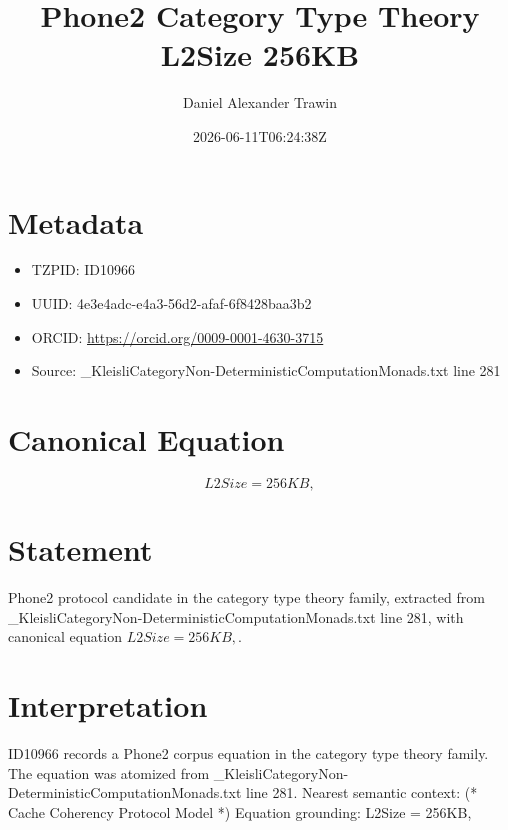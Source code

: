 \documentclass[11pt]{article}
\title{Phone2 Category Type Theory L2Size 256KB}
\author{Daniel Alexander Trawin}
\date{2026-06-11T06:24:38Z}
\begin{document}
\maketitle
\section*{Metadata}
\begin{itemize}
\item TZPID: ID10966
\item UUID: 4e3e4adc-e4a3-56d2-afaf-6f8428baa3b2
\item ORCID: \url{https://orcid.org/0009-0001-4630-3715}
\item Source: _KleisliCategoryNon-DeterministicComputationMonads.txt line 281
\end{itemize}
\section*{Canonical Equation}
\[
L2Size = 256KB,
\]
\section*{Statement}
Phone2 protocol candidate in the category type theory family, extracted from _KleisliCategoryNon-DeterministicComputationMonads.txt line 281, with canonical equation $L2Size = 256KB,$.
\section*{Interpretation}
ID10966 records a Phone2 corpus equation in the category type theory family. The equation was atomized from _KleisliCategoryNon-DeterministicComputationMonads.txt line 281. Nearest semantic context: (* Cache Coherency Protocol Model *) Equation grounding: L2Size = 256KB,
\end{document}
